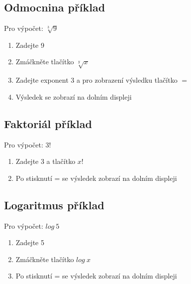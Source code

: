 \documentclass[11pt,a4paper]{article}
\begin{document}
\subsection{Odmocnina příklad}
Pro výpočet: $\sqrt[3]{9}$ 
\begin{enumerate}
\item Zadejte 9
\item Zmáčkněte tlačítko $\sqrt[y]{x}$
\item Zadejte exponent 3 a pro zobrazení výsledku tlačítko $=$
\item Výsledek se zobrazí na dolním displeji
\end{enumerate}

\subsection{Faktoriál příklad}
Pro výpočet: $3!$ 
\begin{enumerate}
\item Zadejte 3 a tlačítko $x!$
\item Po stisknutí = se výsledek zobrazí na dolním displeji
\end{enumerate}

\subsection{Logaritmus příklad}
Pro výpočet: $log~5$ 
\begin{enumerate}
\item Zadejte 5
\item Zmáčkněte tlačítko $log~x$
\item Po stisknutí = se výsledek zobrazí na dolním displeji
\end{enumerate}
\end{document}
